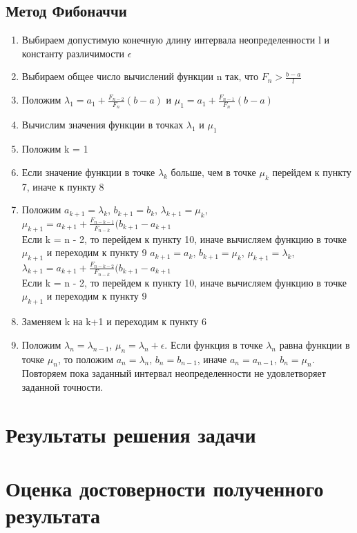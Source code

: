 \documentclass[main.tex]{subfiles}
\begin{document}
	\subsection{Метод Фибоначчи}
	\begin{enumerate}
		\item Выбираем допустимую конечную длину интервала неопределенности l и константу различимости $\epsilon$ 
		\item Выбираем общее число вычислений функции n так, что $F_n >\frac{b-a}{l}$
		\item Положим $\lambda_1 = a_1+\frac{F_{n-2}}{F_n}(b-a)$ и  $\mu_1 = a_1+\frac{F_{n-1}}{F_n}(b-a)$
		\item Вычислим значения функции в точках $\lambda_1$ и $\mu_1$
		\item Положим k = 1
		\item Если значение функции в точке $\lambda_k$ больше, чем в точке $\mu_k$ перейдем к пункту 7, иначе к пункту 8
		\item Положим $a_{k+1} = \lambda_k$, $b_{k+1} = b_k$, $\lambda_{k+1} = \mu_k$, $\mu_{k+1} = a_{k+1}+\frac{F_{n-k-1}}{F_{n-k}}(b_{k+1}-a_{k+1}$\\
		Если k = n - 2, то перейдем к пункту 10, иначе вычисляем функцию в точке $\mu_{k+1}$ и переходим к пункту 9
		 $a_{k+1} = a_k$, $b_{k+1} = \mu_k$, $\mu_{k+1} = \lambda_k$, $\lambda_{k+1} = a_{k+1}+\frac{F_{n-k-2}}{F_{n-k}}(b_{k+1}-a_{k+1}$\\
		Если k = n - 2, то перейдем к пункту 10, иначе вычисляем функцию в точке $\mu_{k+1}$ и переходим к пункту 9
		\item Заменяем k на k+1 и переходим к пункту 6
		\item Положим $\lambda_{n} = \lambda_{n-1}$, $\mu_{n} = \lambda_n + \epsilon$. Если функция в точке $\lambda_n$ равна функции в точке $\mu_n$, то положим $a_n = \lambda_n$, $b_n=b_{n-1}$, иначе $a_n = a_{n-1}$, $b_n=\mu_n$. Повторяем пока заданный интервал неопределенности не удовлетворяет заданной точности.
	\end{enumerate}
	
	\section{Результаты решения задачи}
	
	\section{Оценка достоверности полученного результата}
	
	\begin{thebibliography}{99}
		
	\end{thebibliography}
	
	
\end{document}

